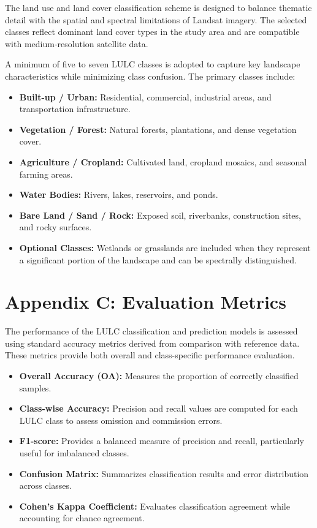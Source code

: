 \documentclass[main]{subfiles}
\begin{document}
The land use and land cover classification scheme is designed to balance thematic detail with the spatial and spectral limitations of Landsat imagery. The selected classes reflect dominant land cover types in the study area and are compatible with medium-resolution satellite data.

A minimum of five to seven LULC classes is adopted to capture key landscape characteristics while minimizing class confusion. The primary classes include:
\begin{itemize}
    \item \textbf{Built-up / Urban:} Residential, commercial, industrial areas, and transportation infrastructure.
    \item \textbf{Vegetation / Forest:} Natural forests, plantations, and dense vegetation cover.
    \item \textbf{Agriculture / Cropland:} Cultivated land, cropland mosaics, and seasonal farming areas.
    \item \textbf{Water Bodies:} Rivers, lakes, reservoirs, and ponds.
    \item \textbf{Bare Land / Sand / Rock:} Exposed soil, riverbanks, construction sites, and rocky surfaces.
    \item \textbf{Optional Classes:} Wetlands or grasslands are included when they represent a significant portion of the landscape and can be spectrally distinguished.
\end{itemize}

\section*{Appendix C: Evaluation Metrics}

The performance of the LULC classification and prediction models is assessed using standard accuracy metrics derived from comparison with reference data. These metrics provide both overall and class-specific performance evaluation.

\begin{itemize}
    \item \textbf{Overall Accuracy (OA):} Measures the proportion of correctly classified samples.
    \item \textbf{Class-wise Accuracy:} Precision and recall values are computed for each LULC class to assess omission and commission errors.
    \item \textbf{F1-score:} Provides a balanced measure of precision and recall, particularly useful for imbalanced classes.
    \item \textbf{Confusion Matrix:} Summarizes classification results and error distribution across classes.
    \item \textbf{Cohen’s Kappa Coefficient:} Evaluates classification agreement while accounting for chance agreement.
\end{itemize}
\end{document}
